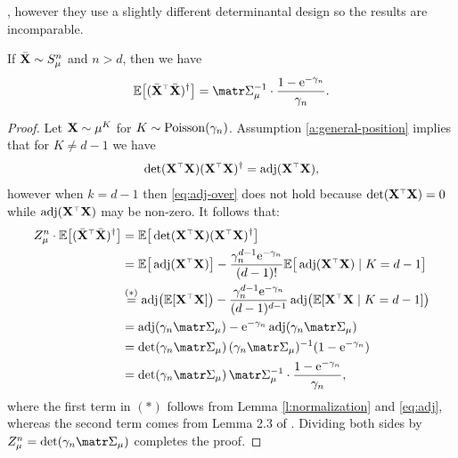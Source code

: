 \documentclass[../../thesis.tex]{subfiles}
\begin{document}
\cite{correcting-bias-journal}, however they use a slightly
different determinantal design so the results are incomparable.
\begin{lemma}\label{l:sqinv-over}
  If ${\bar{\mathbf X}}\sim S_\mu^n$ and $n>d$, then we
  have
  \begin{align*}
    \E\big[ (\Xb^\top\Xb)^{\dagger}\big] =
    \Sigmab_\mu^{-1}\cdot \frac{1-\ee^{-\gamma_n}}{\gamma_n}.
  \end{align*}
\end{lemma}
\begin{proof}
  Let $\mathbf X\sim\mu^K$ for $K\sim{\operatorname{Poisson}}(\gamma_n)$. Assumption
  \ref{a:general-position} implies that for $K\neq d-1$ we have
  \begin{align}
    \det(\X^\top\X)(\X^\top\X)^\dagger=\adj(\X^\top\X),\label{eq:adj-over}
  \end{align}
  however when $k=d-1$ then \eqref{eq:adj-over} does not hold because
  $\det(\X^\top\X)=0$ while $\adj(\X^\top\X)$ may be non-zero. It
  follows that:
  \begin{align*}
    Z_\mu^n\cdot
    \E\big[ (\Xb^\top\Xb)^{\dagger}\big]
     & =\E\big[\det(\X^\top\X)(\X^\top\X)^\dagger\big]                                      \\
     & =\E\big[\adj(\X^\top\X)\big]-
    \frac{\gamma_n^{d-1}\ee^{-\gamma_n}}{(d-1)!}
    \E\big[\adj(\X^\top\X)\mid K=d-1\big]                                                   \\
     & \overset{(*)}{=}\adj\!\big(\E[\X^\top\X]\big) -
    \frac{\gamma_n^{d-1}\ee^{-\gamma_n}}{(d-1)^{d-1}}
    \adj\!\big(\E[\X^\top\X\mid K=d-1]\big)                                                 \\
     & =\adj(\gamma_n\Sigmab_\mu) - \ee^{-\gamma_n}\adj(\gamma_n\Sigmab_\mu)                \\
     & =\det(\gamma_n\Sigmab_\mu)\,(\gamma_n\Sigmab_\mu)^{-1}(1-\ee^{-\gamma_n})            \\
     & =\det(\gamma_n\Sigmab_\mu)\,\Sigmab_\mu^{-1}\cdot\frac{1-\ee^{-\gamma_n}}{\gamma_n},
  \end{align*}
  where the first term in $(*)$ follows from Lemma
  \ref{l:normalization} and \eqref{eq:adj}, whereas the second term comes
  from Lemma 2.3 of \cite{correcting-bias-journal}.
  Dividing both sides by $Z_\mu^n=\det(\gamma_n\Sigmab_\mu)$ completes the proof.
\end{proof}
\end{document}
